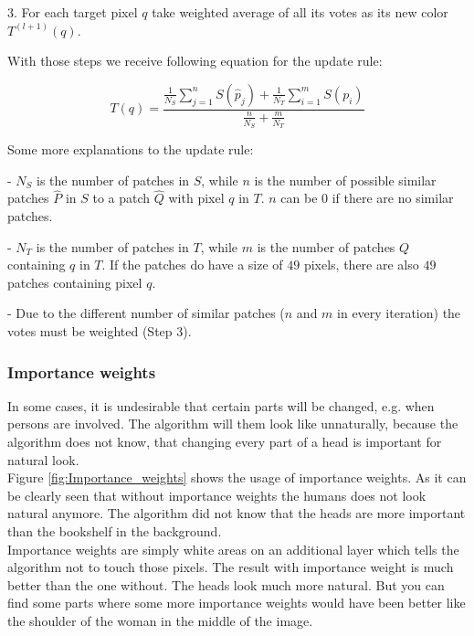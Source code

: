 \vspace{15px}
3. For each target pixel $q$ take weighted average of all its votes as its new color $T^{(l+1)}(q)$.

\vspace{15px}
With those steps we receive following equation for the update rule:

\large
\begin{equation}
\label{Eq:Update rule}
T(q)=\frac{\frac{1}{N_{S}} \sum_{j=1}^{n} S(\hat{p}_{j}) + \frac{1}{N_{T}} \sum_{i=1}^{m} S(p_{i})}{\frac{n}{N_{S}} + \frac{m}{N_{T}}}
\end{equation}
\normalsize

\vspace{15px}
Some more explanations to the update rule:

\vspace{7px}
- $N_{S}$ is the number of patches in $S$, while $n$ is the number of possible similar patches $\hat{P}$ in $S$ to a patch $\hat{Q}$ with pixel $q$ in $T$. $n$ can be $0$ if there are no similar patches.

\vspace{7px}
- $N_{T}$ is the number of patches in $T$, while $m$ is the number of patches $Q$ containing $q$ in $T$. If the patches do have a size of $49$ pixels, there are also $49$ patches containing pixel $q$. 

\vspace{7px}
- Due to the different number of similar patches ($n$ and $m$ in every iteration) the votes must be weighted (Step 3).



\subsubsection{Importance weights}
In some cases, it is undesirable that certain parts will be changed, e.g. when persons are involved. The algorithm will them look like unnaturally, because the algorithm does not know, that changing every part of a head is important for natural look.\\
Figure \ref{fig:Importance_weights} shows the usage of importance weights. As it can be clearly seen that without importance weights the humans does not look natural anymore. The algorithm did not know that the heads are more important than the bookshelf in the background.\\
Importance weights are simply white areas on an additional layer which tells the algorithm not to touch those pixels. The result with importance weight is much better than the one without. The heads look much more natural. But you can find some parts where some more importance weights would have been better like the shoulder of the woman in the middle of the image.

